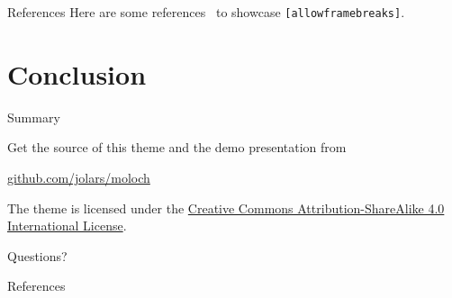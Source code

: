 \documentclass[10pt]{beamer}
\begin{document}
\begin{frame}[fragile]{References}
  Here are some references~\cite{Knuth92,ConcreteMath,Simpson,Er01,greenwade93} to showcase \verb+[allowframebreaks]+.
\end{frame}

\section{Conclusion}

\begin{frame}{Summary}

  Get the source of this theme and the demo presentation from
  \begin{center}
    \url{github.com/jolars/moloch}
  \end{center}

  The theme is licensed under the
  \href{http://creativecommons.org/licenses/by-sa/4.0/}{Creative Commons Attribution-ShareAlike 4.0 International License}.

  \begin{center}
    \ccbysa
  \end{center}

\end{frame}

\begin{frame}[standout]
  Questions?
\end{frame}

\appendix

\begin{frame}[allowframebreaks]{References}
  
  
\end{frame}
\end{document}
